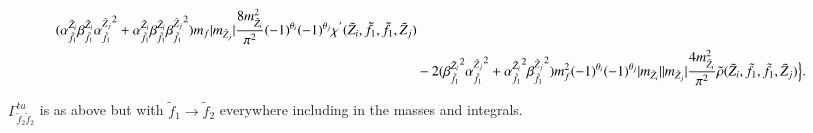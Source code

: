 \documentclass[final,3p,times,pdflatex]{elsarticle}
\begin{document}
\begin{equation}
\begin{aligned}
({\alpha_{\tilde{f}_1}^{\tilde{Z}_i}}{\beta_{\tilde{f}_1}^{\tilde{Z}_i}}{\alpha_{\tilde{f}_1}^{\tilde{Z}_j}}^2 + {\alpha_{\tilde{f}_1}^{\tilde{Z}_i}}{\beta_{\tilde{f}_1}^{\tilde{Z}_i}} {\beta_{\tilde{f}_1}^{\tilde{Z}_j}}^2)m_{f}|m_{\tilde{Z}_j}|{8m_{\tilde{Z}_i}^2 \over \pi^2}(-1)^{\theta_i}(-1)^{\theta_j}\chi^{'}(\tilde{Z}_i,\tilde{f}_1,\tilde{f}_1,\tilde{Z}_j) \\ & -2({\beta_{\tilde{f}_1}^{\tilde{Z}_i}}^2{\alpha_{\tilde{f}_1}^{\tilde{Z}_j}}^2   + {\alpha_{\tilde{f}_1}^{\tilde{Z}_i}}^2 {\beta_{\tilde{f}_1}^{\tilde{Z}_j}}^2)m_{f}^2 (-1)^{\theta_i}(-1)^{\theta_j}|m_{\tilde{Z}_i}||m_{\tilde{Z}_j}|{4 m_{\tilde{Z}_i}^2 \over \pi^2}\tilde{\rho}(\tilde{Z}_i,\tilde{f}_1,\tilde{f}_1,\tilde{Z}_j)\Big\}.
\end{aligned}
\end{equation}

$\Gamma_{\tilde{f}_2 \tilde{f}_2}^{tu}$ is as above but with $\tilde{f}_1 \rightarrow \tilde{f}_2$ everywhere including in the masses and integrals.
\end{document}
